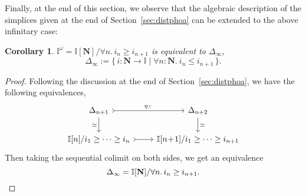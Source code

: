 \documentclass[12pt]{amsart}
\newtheorem{corollary}[theorem]{Corollary}
\theoremstyle{definition}
\newtheorem{definition}[theorem]{Definition}
\newcommand{\mb}[1]{\mathbf{#1}}
\newcommand{\mbb}[1]{\mathbb{#1}}
\newcommand{\I}{\mbb I}
\newcommand{\gn}[1]{\ulcorner\! #1 \!\urcorner}
\newcommand{\mr}[1]{\mathrm{#1}}
\newcommand{\ms}[1]{\mathsf{#1}}
\newcommand{\ov}[1]{\overline{#1}}
\newcommand{\conjt}{\;\&\;}
\newcommand{\nt}{\Rightarrow}
\newcommand{\scomp}[2]{\{\,#1\mid#2\,\}}
\newcommand{\N}{\mb N}
\newcommand{\cprt}{_{\top}}
\newcommand{\fa}[2]{\forall #1\!\colon\!\!#2.\ }
\newcommand{\pss}[1]{||#1||} %
\newcommand{\El}{\mr{El}}
\begin{document}
Finally, at the end of this section, we observe that the algebraic description of the simplices given at the end of Section~\ref{sec:distphoa} can be extended to the above infinitary case:

\begin{corollary}
  $\I^{\ov\omega} = \I[\N]/\forall n.\, i_n \ge i_{n+1}$ is equivalent to $\Delta_\infty$, 
  \[ \Delta_\infty := \scomp{i : \N \to \I}{\fa n\N i_n \le i_{n+1}}. \]
\end{corollary}
\begin{proof}
  Following the discussion at the end of Section~\ref{sec:distphoa}, we have the following equivalences,
  \[
    \begin{tikzcd}
      \Delta_{n+1} \ar[r, tail, "\eta\cprt"] \ar[d, "\simeq"'] & \Delta_{n+2}  \ar[d, "\simeq"] \\ 
      \I[n]/i_1 \ge \cdots \ge i_n \ar[r, tail] & \I[n\!+\!1]/i_1 \ge \cdots \ge i_{n+1} 
    \end{tikzcd}
  \]
  Then taking the sequential colimit on both sides, we get an equivalence
  \[ \Delta_{\infty} = \I[\N]/\forall n.\, i_n \ge i_{n+1}. \qedhere \]
\end{proof}



\end{document}
